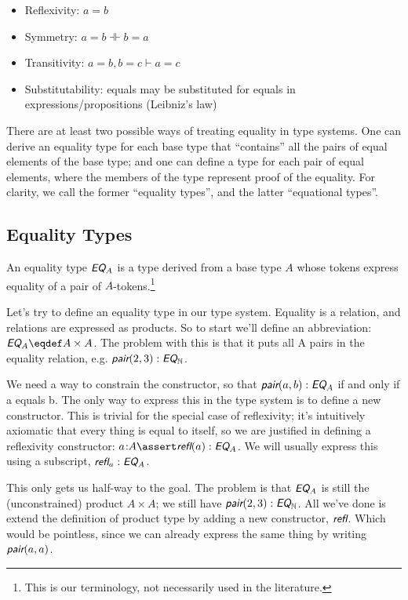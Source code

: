 \documentclass{article}
\begin{document}
\begin{itemize}
\item Reflexivity: \(a=b\)
\item Symmetry: \(a=b \dashVdash b=a\)
\item Transitivity: \(a=b, b=c \vdash a=c\)
\item Substitutability: equals may be substituted for equals in
  expressions/propositions (Leibniz's law)
\end{itemize}


There are at least two possible ways of treating equality in type
systems. One can derive an equality type for each base type that
``contains'' all the pairs of equal elements of the base type; and one
can define a type for each pair of equal elements, where the members
of the type represent proof of the equality. For clarity, we call the
former ``equality types'', and the latter ``equational types''.

\subsection{Equality Types}

An equality type \(\EQ_A\) is a type derived from a base type \(A\)
whose tokens express equality of a pair of \(A\)-tokens.\footnote{This is our terminology, not necessarily used in the literature.}

Let's try to define an equality type in our type system. Equality is a
relation, and relations are expressed as products. So to start we'll
define an abbreviation: \(\EQ_A\defn A\times A\). The problem with
this is that it puts all A pairs in the equality relation, e.g.
\(\pair(2,3):\EQ_{\Nat}\).

We need a way to constrain the constructor, so that
\(\pair(a,b):\EQ_A\) if and only if a equals b. The only way to
express this in the type system is to define a new constructor. This
is trivial for the special case of reflexivity; it's intuitively
axiomatic that every thing is equal to itself, so we are justified in
defining a reflexivity constructor: \(a\type A\linfer\refl(a):\EQ_A\).
We will usually express this using a subscript, \(\refl_a:\EQ_A\).

This only gets us half-way to the goal. The problem is that \(\EQ_A\)
is still the (unconstrained) product \(A\times A\); we still have
\(\pair(2,3):\EQ_{\Nat}\). All we've done is extend the definition of
product type by adding a new constructor, \(\refl\). Which would be
pointless, since we can already express the same thing by writing
\(\pair(a,a)\).
\end{document}
